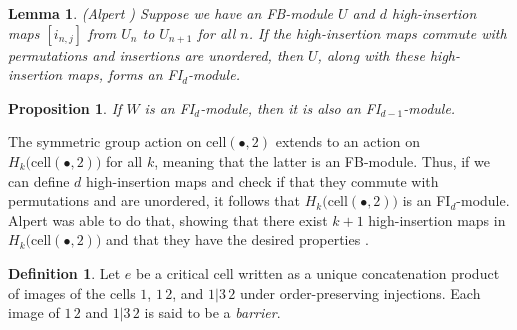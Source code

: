 \documentclass[12py]{amsart}%
\newtheorem{lem}[thm]{Lemma}
\newtheorem{prop}[thm]{Proposition}
\newtheorem{cor}[thm]{Corollary}
\theoremstyle{definition}\newtheorem{definition}[thm]{Definition}
\theoremstyle{definition}
\newtheorem{defn}[thm]{Definition}
\begin{document}
\begin{lem}
(Alpert \cite[Lemma 5.1]{alpert2020generalized}) Suppose we have an FB-module $U$ and $d$ high-insertion maps $[i_{n,j}]$ from $U_{n}$ to $U_{n+1}$ for all $n$. If the high-insertion maps commute with permutations and insertions are unordered, then $U$, along with these high-insertion maps, forms an FI$_{d}$-module. 
\end{lem}

\begin{prop}\label{makesmallerFId}
If $W$ is an FI$_{d}$-module, then it is also an FI$_{d-1}$-module.
\end{prop}




The symmetric group action on $\text{cell}(\bullet,2)$ extends to an action on $H_{k}\big(\text{cell}(\bullet,2)\big)$ for all $k$, meaning that the latter is an FB-module. Thus, if we can define $d$ high-insertion maps and check if that they commute with permutations and are unordered, it follows that $H_{k}\big(\text{cell}(\bullet,2)\big)$ is an FI$_{d}$-module. Alpert was able to do that, showing that there exist $k+1$ high-insertion maps in $H_{k}\big(\text{cell}(\bullet,2)\big)$ and that they have the desired properties \cite[Theorem 6.1]{alpert2020generalized}.

\begin{defn}
Let $e$ be a critical cell written as a unique concatenation product of images of the cells $1$, $1\,2$, and $1|3\,2$ under order-preserving injections. Each image of $1\,2$ and $1|3\,2$ is said to be a \emph{barrier}.
\end{defn}
\end{document}
